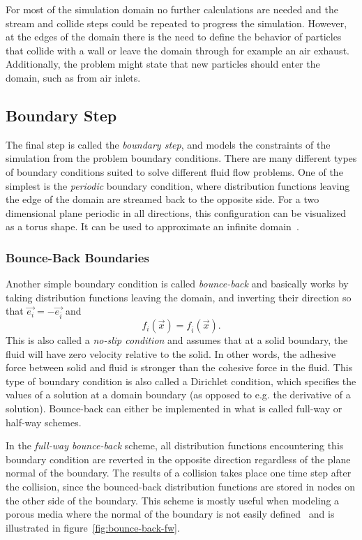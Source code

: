 For most of the simulation domain no further calculations are needed and the stream and collide steps could be repeated to progress the simulation. However, at the edges of the domain there is the need to define the behavior of particles that collide with a wall or leave the domain through for example an air exhaust. Additionally, the problem might state that new particles should enter the domain, such as from air inlets.

\subsection{Boundary Step} \label{sec:boundary_step}
The final step is called the \textit{boundary step}, and models the constraints of the simulation from the problem boundary conditions. There are many different types of boundary conditions suited to solve different fluid flow problems. One of the simplest is the \textit{periodic} boundary condition, where distribution functions leaving the edge of the domain are streamed back to the opposite side. For a two dimensional plane periodic in all directions, this configuration can be visualized as a torus shape. It can be used to approximate an infinite domain~\cites[pg.63]{Delbosc}. 

\subsubsection{Bounce-Back Boundaries}
Another simple boundary condition is called \textit{bounce-back} and basically works by taking distribution functions leaving the domain, and inverting their direction so that $\vec{e_i}=-\vec{e_{\overline{i}}}$ and
\begin{equation}
f_i(\vec{x}) = f_{\overline{i}}(\vec{x}).
\end{equation}
This is also called a \textit{no-slip condition} and assumes that at a solid boundary, the fluid will have zero velocity relative to the solid. In other words, the adhesive force between solid and fluid is stronger than the cohesive force in the fluid. This type of boundary condition is also called a Dirichlet condition, which specifies the values of a solution at a domain boundary (as opposed to e.g. the derivative of a solution). Bounce-back can either be implemented in what is called full-way or half-way schemes.

In the  \textit{full-way bounce-back} scheme, all distribution functions encountering this boundary condition are reverted in the opposite direction regardless of the plane normal of the boundary. The results of a collision takes place one time step after the collision, since the bounced-back distribution functions are stored in nodes on the other side of the boundary. This scheme is mostly useful when modeling a porous media where the normal of the boundary is not easily defined~\cites[pg.64]{Delbosc} and is illustrated in figure~\ref{fig:bounce-back-fw}.

